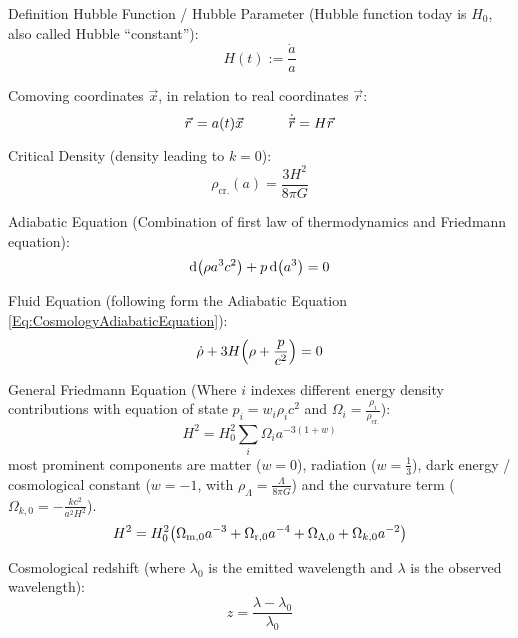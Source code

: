 		\noindent
		Definition Hubble Function / Hubble Parameter{} (Hubble function today is $H_0$, also called Hubble ``constant''):
		\begin{equation}
			H(t) := \frac{\dot{a}}{a}
		\end{equation}

		\noindent
		Comoving coordinates $\vec{x}$, in relation to real coordinates $\vec{r}$:
		\begin{equation}
			\vec{r} = a(t) \vec{x}
			\hsp
			\dot{\vec{r}} = H \vec{r}
		\end{equation}

		\noindent
		Critical Density (\ie density leading to $k=0$):
		\begin{equation}
			\rho_\text{cr.} (a) = \frac{3 H^2}{8 \pi G}
		\end{equation}

		\noindent
		Adiabatic Equation (Combination of first law of thermodynamics and Friedmann equation):
		\begin{equation}
			\label{Eq:CosmologyAdiabaticEquation}
			\dd \qty(\rho a^3 c^2) + p \dd (a^3) = 0
		\end{equation}

		\noindent
		Fluid Equation (following form the Adiabatic Equation \ref{Eq:CosmologyAdiabaticEquation}):
		\begin{equation}
			\dot{\rho} + 3 H \qty(\rho + \frac{p}{c^2}) = 0
		\end{equation}

		\noindent
		General Friedmann Equation (Where $i$ indexes different energy density contributions with equation of state $p_i = w_i \rho_i c^2$ and $\Omega_i = \frac{\rho_i}{\rho_\text{cr.}}$):
		\begin{equation}
			H^2 = H_0^2\sum_i \Omega_i a^{-3(1+w)}
		\end{equation}
		most prominent components are matter ($w=0$), radiation ($w=\frac{1}{3}$), dark energy / cosmological constant ($w=-1$, with $\rho_\Lambda = \frac{\Lambda}{8\pi G}$) and the curvature term ($\Omega_{k,0}=-\frac{k c^2}{a^2 H^2}$).
		\begin{equation}
			H^2 = H_0^2 \qty(\Omega_{\text{m},0} a^{-3} + \Omega_{\text{r},0} a^{-4} + \Omega_{\Lambda,0} + \Omega_{k,0} a^{-2})
		\end{equation}

		\noindent
		Cosmological redshift (where $\lambda_0$ is the emitted wavelength and $\lambda$ is the observed wavelength):
		\begin{equation}
			z = \frac{\lambda - \lambda_0}{\lambda_0}
		\end{equation}

